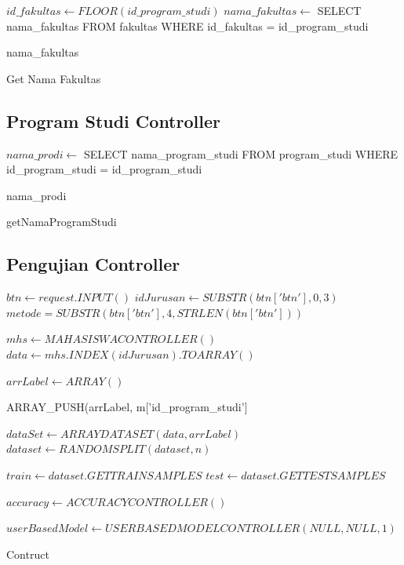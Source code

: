 \begin{algorithm}[H]
  \begin{algorithmic}[1]
        \State $id\_fakultas \gets FLOOR(id\_program\_studi)$
        \State $nama\_fakultas \gets$ SELECT nama\_fakultas FROM fakultas WHERE id\_fakultas = id\_program\_studi
        
        \State \Return nama\_fakultas
    \EndProcedure
  \end{algorithmic} 
  \caption{Get Nama Fakultas}
  \label{alg:getNamaFakultas}
\end{algorithm}

\subsection{Program Studi Controller}

\begin{algorithm}[H]
  \begin{algorithmic}[1]
        \State $nama\_prodi \gets$ SELECT nama\_program\_studi FROM program\_studi WHERE id\_program\_studi = id\_program\_studi
        
        \State \Return nama\_prodi
    \EndProcedure
  \end{algorithmic} 
  \caption{getNamaProgramStudi}
  \label{alg:getNamaProgramStudi}
\end{algorithm}

\subsection{Pengujian Controller}
\label{subsec:pengujian controller}

\begin{algorithm}[H]
  \begin{algorithmic}[1]
       \State $btn \gets request.INPUT()$
       \State $idJurusan \gets SUBSTR(btn['btn'], 0, 3)$
       \State $metode = SUBSTR(btn['btn'], 4, STRLEN(btn['btn']))$
       
       \State $mhs \gets MAHASISWACONTROLLER()$
       \State $data \gets mhs.INDEX(idJurusan).TOARRAY()$
       
       \State $arrLabel \gets ARRAY()$ 
       
            \State ARRAY\_PUSH(arrLabel, m['id\_program\_studi']
       \EndFor
       
       \State $dataSet \gets ARRAYDATASET(data, arrLabel)$
       \State $dataset \gets RANDOMSPLIT(dataset, n)$ 
       
       \State $train \gets dataset.GETTRAINSAMPLES$
       \State $test \gets dataset.GETTESTSAMPLES$
       
       \State $accuracy \gets ACCURACYCONTROLLER()$
       
       \State $userBasedModel \gets USERBASEDMODELCONTROLLER(NULL, NULL, 1)$
    \EndProcedure
  \end{algorithmic} 
  \caption{Contruct}
  \label{alg:contruct pengujian}
\end{algorithm}

